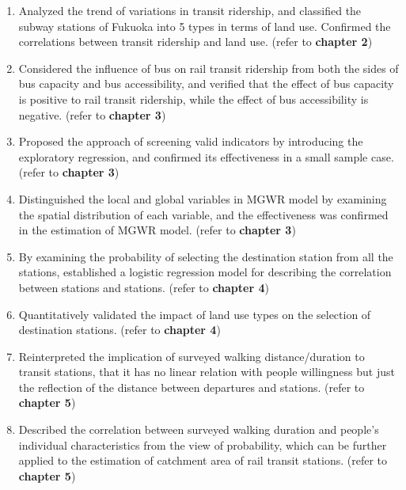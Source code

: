 \begin{enumerate}
	\item Analyzed the trend of variations in transit ridership, and classified the subway stations of Fukuoka into 5 types in terms of land use. Confirmed the correlations between transit ridership and land use. (refer to \textbf{chapter 2})
	
	\item Considered the influence of bus on rail transit ridership from both the sides of bus capacity and bus accessibility, and verified that the effect of bus capacity is positive to rail transit ridership, while the effect of bus accessibility is negative. (refer to \textbf{chapter 3})
	
	\item Proposed the approach of screening valid indicators by introducing the exploratory regression, and confirmed its effectiveness in a small sample case. (refer to \textbf{chapter 3})
	
	\item Distinguished the local and global variables in MGWR model by examining the spatial distribution of each variable, and the effectiveness was confirmed in the estimation of MGWR model. (refer to \textbf{chapter 3})
	
	\item By examining the probability of selecting the destination station from all the stations, established a logistic regression model for describing the correlation between stations and stations. (refer to \textbf{chapter 4})
	
	\item Quantitatively validated the impact of land use types on the selection of destination stations. (refer to \textbf{chapter 4})
	
	\item Reinterpreted the implication of surveyed walking distance/duration to transit stations, that it has no linear relation with people willingness but just the reflection of the distance between departures and stations. (refer to \textbf{chapter 5})
	
	\item Described the correlation between surveyed walking duration and people's individual characteristics from the view of probability, which can be further applied to the estimation of catchment area of rail transit stations. (refer to \textbf{chapter 5})
	
\end{enumerate} 

